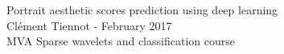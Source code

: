 \documentclass[a4paper,11pt]{article}
\begin{document}
\centering

\noindent \Large{Portrait aesthetic scores prediction using deep learning}\\
\medskip
\noindent \small{Cl\'ement Tiennot - February 2017 \\ MVA Sparse wavelets and classification course}%
\vspace{0.6cm}

\justify
\normalsize 
 
 





%
%

\printbibliography

%
\end{document}
